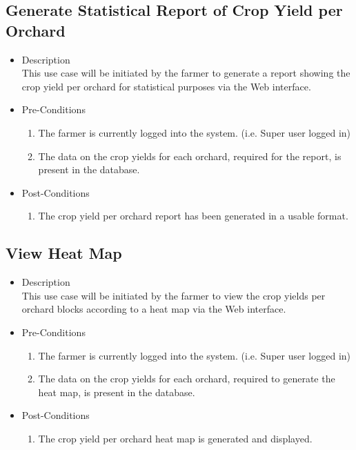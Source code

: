 \documentclass[11pt,fleqn]{book} %
\begin{document}
		\subsection{Generate Statistical Report of Crop Yield per Orchard}
		\begin{itemize}
			\item Description\\
			This use case will be initiated by the farmer to generate a report showing the crop yield per orchard for statistical purposes via the Web interface.
			\item Pre-Conditions
			\begin{enumerate}
				\item The farmer is currently logged into the system. (i.e. Super user logged in)
				\item The data on the crop yields for each orchard, required for the report, is present in the database.									
			\end{enumerate}
			\item Post-Conditions
			\begin{enumerate}
				\item The crop yield per orchard report has been generated in a usable format.
			\end{enumerate}
		\end{itemize}
		
		\subsection{View Heat Map}
		\begin{itemize}
			\item Description\\
			This use case will be initiated by the farmer to view the crop yields per orchard blocks according to a heat map via the Web interface.
			\item Pre-Conditions
			\begin{enumerate}
				\item The farmer is currently logged into the system. (i.e. Super user logged in)
				\item The data on the crop yields for each orchard, required to generate the heat map, is present in the database.	
			\end{enumerate}
			\item Post-Conditions
			\begin{enumerate}
				\item The crop yield per orchard heat map is generated and displayed.
			\end{enumerate}
		\end{itemize}
		
\end{document}
